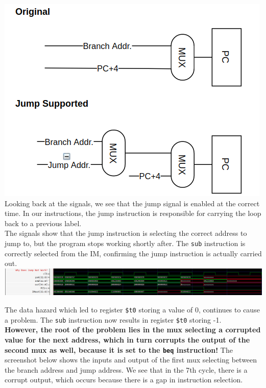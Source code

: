 \documentclass[twocolumn]{article}
\newcommand{\cc}[1]{\texttt{#1}}
\begin{document}
\begingroup
    \centering
    \medskip
    \includegraphics[width=0.65\columnwidth]{Lab-Tex/Lab6-images/p6.png}
    \medskip
\endgroup
\\
Looking back at the signals, we see that the jump signal is enabled at the correct time. In our instructions, the jump instruction is responsible for carrying the loop back to a previous label. \\

The signals show that the jump instruction is selecting the correct address to jump to, but the program stops working shortly after. The \cc{sub} instruction is correctly selected from the IM, confirming the jump instruction is actually carried out. 
\\

\begingroup
    \centering
    \medskip
    \includegraphics[width=\columnwidth]{Lab-Tex/Lab6-images/p7.png}
    \medskip
\endgroup

The data hazard which led to register \cc{\$t0} storing a value of 0, continues to cause a problem. The \cc{sub} instruction now results in register \cc{\$t0} storing -1. \\

\textbf{However, the root of the problem lies in the mux selecting a corrupted value for the next address, which in turn corrupts the output of the second mux as well, because it is set to the \cc{beq} instruction!} The screenshot below shows the inputs and output of the first mux selecting between the branch address and jump address. We see that in the 7th cycle, there is a corrupt output, which occurs because there is a gap in instruction selection. \\
\end{document}
